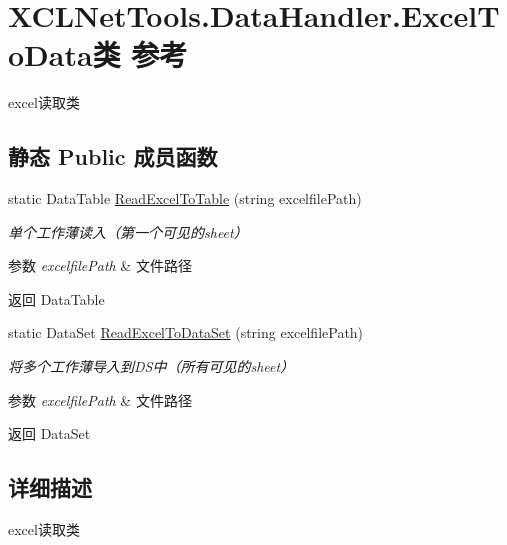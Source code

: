 \hypertarget{class_x_c_l_net_tools_1_1_data_handler_1_1_excel_to_data}{\section{X\-C\-L\-Net\-Tools.\-Data\-Handler.\-Excel\-To\-Data类 参考}
\label{class_x_c_l_net_tools_1_1_data_handler_1_1_excel_to_data}
}


excel读取类  


\subsection*{静态 Public 成员函数}
\begin{DoxyCompactItemize}
\item 
static Data\-Table \hyperlink{class_x_c_l_net_tools_1_1_data_handler_1_1_excel_to_data_adbc7d208ff0dbc770c7cf52d6a6f3673}{Read\-Excel\-To\-Table} (string excelfile\-Path)
\begin{DoxyCompactList}\small\item\em 单个工作薄读入（第一个可见的sheet） 
\begin{DoxyParams}{参数}
{\em excelfile\-Path} & 文件路径\\
\hline
\end{DoxyParams}
\begin{DoxyReturn}{返回}
Data\-Table
\end{DoxyReturn}
\end{DoxyCompactList}\item 
static Data\-Set \hyperlink{class_x_c_l_net_tools_1_1_data_handler_1_1_excel_to_data_ae7cfc36013815d61fbad11460386541f}{Read\-Excel\-To\-Data\-Set} (string excelfile\-Path)
\begin{DoxyCompactList}\small\item\em 将多个工作薄导入到\-D\-S中（所有可见的sheet） 
\begin{DoxyParams}{参数}
{\em excelfile\-Path} & 文件路径\\
\hline
\end{DoxyParams}
\begin{DoxyReturn}{返回}
Data\-Set
\end{DoxyReturn}
\end{DoxyCompactList}\end{DoxyCompactItemize}


\subsection{详细描述}
excel读取类 



